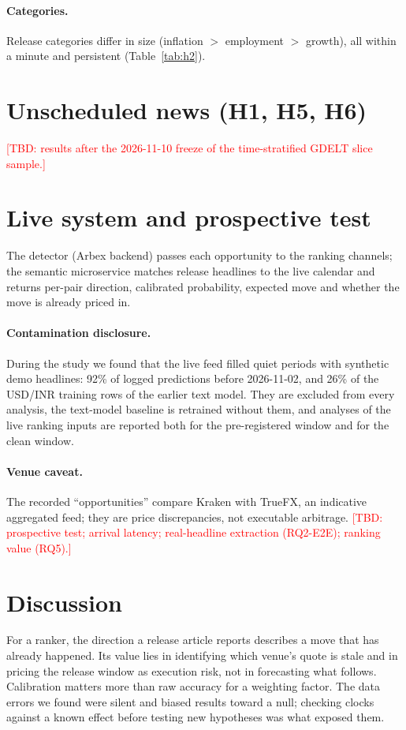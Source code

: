 \documentclass[11pt]{article}
\newcommand{\tbd}[1]{\textcolor{red}{[TBD: #1]}}
\begin{document}
\paragraph{Categories.} Release categories differ in size (inflation $>$ employment $>$ growth),
all within a minute and persistent (Table~\ref{tab:h2}).

\begin{table}[t]\centering\small
\caption{Sign-oriented cumulative response by category (bps), US releases, four majors pooled;
$^{*}$survives Benjamini--Hochberg at $q\le0.05$.}\label{tab:h2}

\end{table}

\section{Unscheduled news (H1, H5, H6)}
\tbd{results after the 2026-11-10 freeze of the time-stratified GDELT slice sample.}

\section{Live system and prospective test}\label{sec:live}
The detector (Arbex backend) passes each opportunity to the ranking channels; the semantic
microservice matches release headlines to the live calendar and returns per-pair direction,
calibrated probability, expected move and whether the move is already priced in.
\paragraph{Contamination disclosure.} During the study we found that the live feed filled quiet
periods with synthetic demo headlines: 92\% of logged predictions before 2026-11-02, and 26\%
of the USD/INR training rows of the earlier text model. They are excluded from every analysis,
the text-model baseline is retrained without them, and analyses of the live ranking inputs are
reported both for the pre-registered window and for the clean window.
\paragraph{Venue caveat.} The recorded ``opportunities'' compare Kraken with TrueFX, an indicative
aggregated feed; they are price discrepancies, not executable arbitrage.
\tbd{prospective test; arrival latency; real-headline extraction (RQ2-E2E); ranking value (RQ5).}

\section{Discussion}
For a ranker, the direction a release article reports describes a move that has already
happened. Its value lies in identifying which venue's quote is stale and in pricing the
release window as execution risk, not in forecasting what follows. Calibration matters more
than raw accuracy for a weighting factor. The data errors we found were silent and biased results
toward a null; checking clocks against a known effect before testing new hypotheses was what
exposed them.
\end{document}
